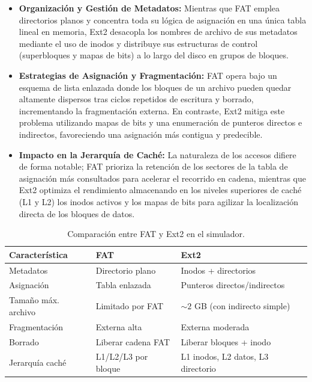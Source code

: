 \documentclass[12pt,a4paper]{article}
\begin{document}
	\begin{itemize}
		\item \textbf{Organización y Gestión de Metadatos:} Mientras que FAT emplea directorios planos y concentra toda su lógica de asignación en una única tabla lineal en memoria, Ext2 desacopla los nombres de archivo de sus metadatos mediante el uso de inodos y distribuye sus estructuras de control (superbloques y mapas de bits) a lo largo del disco en grupos de bloques.
		\item \textbf{Estrategias de Asignación y Fragmentación:} FAT opera bajo un esquema de lista enlazada donde los bloques de un archivo pueden quedar altamente dispersos tras ciclos repetidos de escritura y borrado, incrementando la fragmentación externa. En contraste, Ext2 mitiga este problema utilizando mapas de bits y una enumeración de punteros directos e indirectos, favoreciendo una asignación más contigua y predecible.
		\item \textbf{Impacto en la Jerarquía de Caché:} La naturaleza de los accesos difiere de forma notable; FAT prioriza la retención de los sectores de la tabla de asignación más consultados para acelerar el recorrido en cadena, mientras que Ext2 optimiza el rendimiento almacenando en los niveles superiores de caché (L1 y L2) los inodos activos y los mapas de bits para agilizar la localización directa de los bloques de datos.
	\end{itemize}
	
	\begin{table}[h]
		\centering
		\begin{tabular}{@{}lll@{}}
			\toprule
			\textbf{Característica} & \textbf{FAT} & \textbf{Ext2} \\ \midrule
			Metadatos & Directorio plano & Inodos + directorios \\
			Asignación & Tabla enlazada & Punteros directos/indirectos \\
			Tamaño máx. archivo & Limitado por FAT & $\sim 2$ GB (con indirecto simple) \\
			Fragmentación & Externa alta & Externa moderada \\
			Borrado & Liberar cadena FAT & Liberar bloques + inodo \\
			Jerarquía caché & L1/L2/L3 por bloque & L1 inodos, L2 datos, L3 directorio \\ \bottomrule
		\end{tabular}
		\caption{Comparación entre FAT y Ext2 en el simulador.}
		\label{tab:comparacion}
	\end{table}
	
\end{document}
